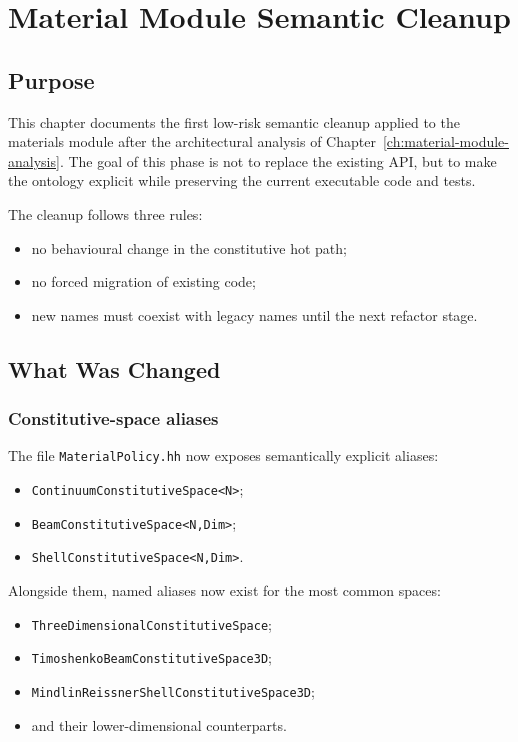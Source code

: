 \chapter{Material Module Semantic Cleanup}
\label{ch:material-semantic-cleanup}

\section{Purpose}

This chapter documents the first low-risk semantic cleanup applied to the
materials module after the architectural analysis of
Chapter~\ref{ch:material-module-analysis}.  The goal of this phase is not to
replace the existing API, but to make the ontology explicit while preserving
the current executable code and tests.

The cleanup follows three rules:
\begin{itemize}
  \item no behavioural change in the constitutive hot path;
  \item no forced migration of existing code;
  \item new names must coexist with legacy names until the next refactor stage.
\end{itemize}

\section{What Was Changed}

\subsection{Constitutive-space aliases}

The file \texttt{MaterialPolicy.hh} now exposes semantically explicit aliases:
\begin{itemize}
  \item \texttt{ContinuumConstitutiveSpace<N>};
  \item \texttt{BeamConstitutiveSpace<N,Dim>};
  \item \texttt{ShellConstitutiveSpace<N,Dim>}.
\end{itemize}

Alongside them, named aliases now exist for the most common spaces:
\begin{itemize}
  \item \texttt{ThreeDimensionalConstitutiveSpace};
  \item \texttt{TimoshenkoBeamConstitutiveSpace3D};
  \item \texttt{MindlinReissnerShellConstitutiveSpace3D};
  \item and their lower-dimensional counterparts.
\end{itemize}

